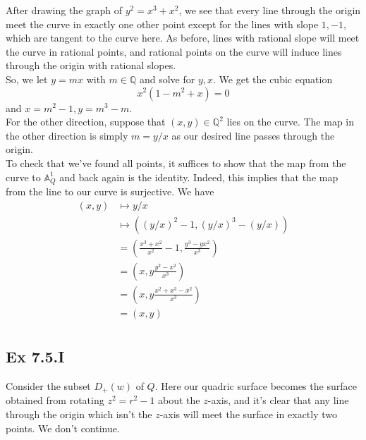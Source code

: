 \documentclass{article}
\theoremstyle{definition}
\newcommand{\Q}{\mathbb{Q}}
\newcommand{\A}{\mathbb{A}}
\begin{document}
After drawing the graph of $y^{2} = x^{3} + x^{2}$, we see that every line
through the origin meet the curve in exactly one other point except for the
lines with slope $1, -1$, which are tangent to the curve here. As before, lines
with rational slope will meet the curve in rational points, and rational points
on the curve will induce lines through the origin with rational slopes. \\

So, we let $y = mx$ with $m \in \Q$ and solve for $y, x$. We get the cubic equation
\[
	x^{2}(1 - m^{2} + x) = 0
\]
and $x = m^{2} - 1, y = m^{3} - m$. \\

For the other direction, suppose that $(x, y) \in \Q^{2}$ lies on the curve.
The map in the other direction is simply $m = y/x$ as our desired line passes
through the origin. \\

To check that we've found all points, it suffices to show that the map from the
curve to $\A^{1}_{Q}$ and back again is the identity. Indeed, this implies that
the map from the line to our curve is surjective. We have
\begin{align*}
	(x, y)
	 & \mapsto
	y/x                                                                         \\
	 & \mapsto
	\left((y/x)^{2} - 1, (y/x)^{3} - (y/x)\right)                               \\
	 & =
	\left(\frac{x^{3} + x^{2}}{x^{2}} - 1, \frac{y^{3} - yx^{2}}{x^{3}} \right) \\
	 & =
	\left(x, y\frac{y^{2} - x^{2}}{x^{3}} \right)                               \\
	 & =
	\left(x, y\frac{x^{2} + x^{3} - x^{2}}{x^{3}} \right)                       \\
	 & =
	\left(x, y\right)                                                           \\
\end{align*}

\subsection*{Ex 7.5.I}

Consider the subset $D_{+}(w)$ of $Q$. Here our quadric surface becomes the
surface obtained from rotating $z^{2} = r^{2} - 1$ about the $z$-axis, and it's
clear that any line through the origin which isn't the $z$-axis will meet the
surface in exactly two points. We don't continue.
\end{document}
